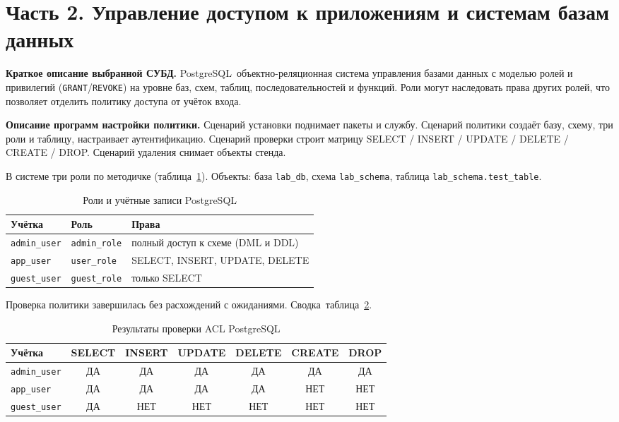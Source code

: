 \section{Часть 2. Управление доступом к приложениям и системам базам данных}
\label{sec:part2}

\textbf{Краткое описание выбранной СУБД.}
PostgreSQL~\mdash  объектно-реляционная система управления базами данных с моделью ролей и привилегий (\texttt{GRANT}/\texttt{REVOKE}) на уровне баз, схем, таблиц, последовательностей и функций. Роли могут наследовать права других ролей, что позволяет отделить политику доступа от учёток входа.

\textbf{Описание программ настройки политики.}
Сценарий установки поднимает пакеты и службу. Сценарий политики создаёт базу, схему, три роли и таблицу, настраивает аутентификацию. Сценарий проверки строит матрицу SELECT / INSERT / UPDATE / DELETE / CREATE / DROP. Сценарий удаления снимает объекты стенда.

В системе три роли по методичке (таблица~\ref{tab:p2-roles}). Объекты: база \texttt{lab\_db}, схема \texttt{lab\_schema}, таблица \texttt{lab\_schema.test\_table}.

\begin{table}[ht]
	\begin{tabularx}{\textwidth}{|l|l|X|}
		\hline
		\textbf{Учётка} & \textbf{Роль} & \textbf{Права} \\
		\hline
		\texttt{admin\_user} & \texttt{admin\_role} & полный доступ к схеме (DML и DDL) \\
		\hline
		\texttt{app\_user} & \texttt{user\_role} & SELECT, INSERT, UPDATE, DELETE \\
		\hline
		\texttt{guest\_user} & \texttt{guest\_role} & только SELECT \\
		\hline
	\end{tabularx}
	\caption{Роли и учётные записи PostgreSQL}
	\label{tab:p2-roles}
\end{table}

Проверка политики завершилась без расхождений с ожиданиями. Сводка~\mdash  таблица~\ref{tab:p2-res}.

\begin{table}[ht]
	\small
	\begin{tabularx}{\textwidth}{|l|c|c|c|c|c|c|}
		\hline
		\textbf{Учётка} & SELECT & INSERT & UPDATE & DELETE & CREATE & DROP \\
		\hline
		\texttt{admin\_user} & ДА & ДА & ДА & ДА & ДА & ДА \\
		\hline
		\texttt{app\_user} & ДА & ДА & ДА & ДА & НЕТ & НЕТ \\
		\hline
		\texttt{guest\_user} & ДА & НЕТ & НЕТ & НЕТ & НЕТ & НЕТ \\
		\hline
	\end{tabularx}
	\caption{Результаты проверки ACL PostgreSQL}
	\label{tab:p2-res}
\end{table}

